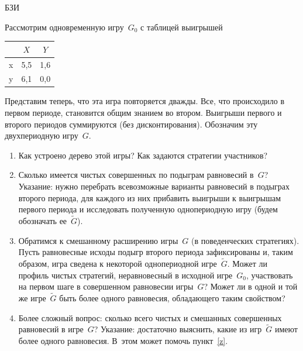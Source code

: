 \begin{problem}
\begin{source}
БЗИ
\end{source} Рассмотрим одновременную
игру~$G_0$ с таблицей выигрышей

\begin{center}
\begin{tabular}{|c|cc|}
\hline &$X$&$Y$\\ \hline x&5,5&1,6\\ y&6,1&0,0\\ \hline
\end{tabular}
\end{center}

Представим теперь, что эта игра повторяется дважды. Все,
что происходило в первом периоде, становится общим знанием
во втором. Выигрыши первого и второго периодов суммируются
(без дисконтирования). Обозначим эту двухпериодную
игру~$G$.

\begin{enumerate}

\item Как устроено дерево этой игры? Как задаются стратегии
участников?

\item Сколько имеется чистых совершенных по подыграм
равновесий в~$G$? Указание: нужно перебрать всевозможные
варианты равновесий в подыграх второго периода, для каждого
из них прибавить выигрыши к выигрышам первого периода и
исследовать полученную однопериодную игру (будем обозначать
ее~$\tilde G$).

\item\label{z} Обратимся к смешанному расширению игры~$G$
(в поведенческих стратегиях). Пусть равновесные исходы
подыгр второго периода зафиксированы и, таким образом, игра
сведена к некоторой однопериодной игре~$\tilde G$. Может ли
профиль чистых стратегий, неравновесный в исходной
игре~$G_0$, участвовать на первом шаге в совершенном
равновесии игры~$G$? Может ли в одной и той же игре~$\tilde
G$ быть более одного равновесия, обладающего таким
свойством?

\item Более сложный вопрос: сколько всего чистых и
смешанных совершенных равновесий в игре~$G$? Указание:
достаточно выяснить, какие из игр~$\tilde G$ имеют более
одного равновесия. В~этом может помочь пункт~\ref{z}.

\end{enumerate}

\begin{sol}

\end{sol}
\end{problem}



